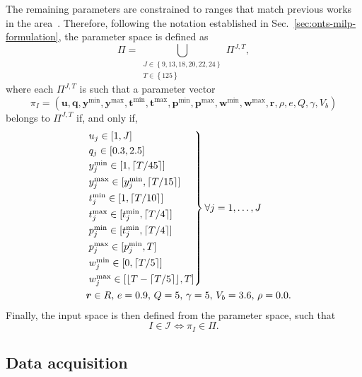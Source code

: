 The remaining parameters are constrained to ranges that match previous works in the area~\cite{rigoBranchandpriceAlgorithmNanosatellite2022,semanEnergyAwareTaskScheduling2022,rigoTaskSchedulingOptimal2021}.
Therefore, following the notation established in Sec.~\ref{sec:onts-milp-formulation}, the parameter space is defined as
\begin{equation}\label{eq:parameter-space}
\Pi = \bigcup_{\substack{J \in \left\{ 9,13,18,20,22,24 \right\} \\ T \in \left\{ 125 \right\} }} \Pi^{J,T}
,\end{equation}
where each $\Pi^{J,T}$ is such that a parameter vector \[
\pi_I= \left( \bm{u}, \bm{q}, \bm{y}^{\min}, \bm{y}^{\max}, \bm{t}^{\min}, \bm{t}^{\max}, \bm{p}^{\min}, \bm{p}^{\max}, \bm{w}^{\min}, \bm{w}^{\max}, \bm{r}, \rho, e, Q, \gamma, V_b \right)
\] belongs to $\Pi^{J,T}$ if, and only if,
\begin{equation*}
\begin{aligned}
&\begin{rcases}
    & u_j \in [1, J] \\
	 & q_j \in [0.3, 2.5] \\
    	 & y_j^{\min} \in [1, \lceil T/45 \rceil] \\
    	 & y_j^{\max} \in [y_j^{\min}, \lceil T/15 \rceil] \\
    	 & t_j^{\min} \in [1, \lceil T/10 \rceil] \\
    	 & t_j^{\max} \in [t_j^{\min}, \lceil T/4 \rceil] \\
    	 & p_j^{\min} \in [t_j^{\min}, \lceil T/4 \rceil] \\
    	 & p_j^{\max} \in [p_j^{\min}, T] \\
    	 & w_j^{\min} \in [0, \lceil T/5 \rceil] \\
    	 & w_j^{\max} \in [\lfloor T-\lceil T/5 \rceil \rfloor, T]
\end{rcases} \forall j =1,\ldots,J \\
    &\quad \bm{r} \in R ,\, e = 0.9 ,\, Q = 5 ,\, \gamma = 5 ,\, V_b = 3.6 ,\, \rho = 0.0
.\end{aligned}
\end{equation*}
Finally, the input space is then defined from the parameter space, such that \[
    I\in \mathcal{I} \iff \pi_I \in \Pi 
.\] 


\subsection{Data acquisition}\label{sec:data-acquisition}


